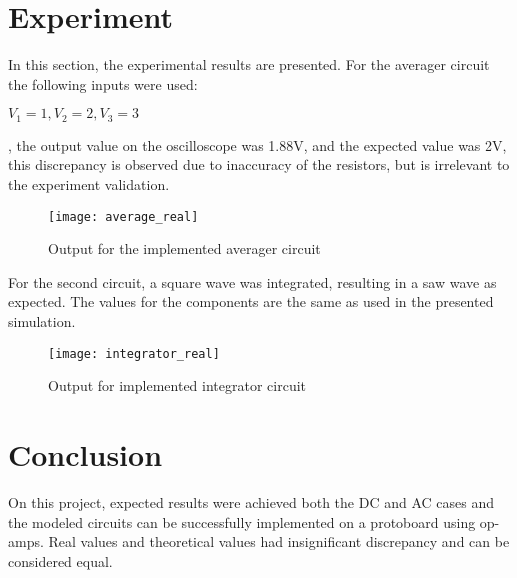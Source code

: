 \documentclass[journal]{IEEEtran}
\begin{document}
\section{Experiment}
    In this section, the experimental results are presented.
    For the averager circuit the following inputs were used: \centerline{$V_1 = 1, V_2 = 2, V_3 = 3$}, the output value on the oscilloscope was 1.88V, and the expected value was 2V, this discrepancy is observed due to inaccuracy of the resistors, but is irrelevant to  the experiment validation.
    \begin{figure}[H]
        \centering
        \texttt{[image: average\_real]}
        \caption{Output for the implemented averager circuit}
        \label{fig:average_real}
    \end{figure}
    For the second circuit, a square wave was integrated, resulting in a saw wave as expected. The values for the components are the same as used in the presented simulation.
    \begin{figure}[H]
        \centering
        \texttt{[image: integrator\_real]}
        \caption{Output for implemented integrator circuit}
        \label{fig:integrator_real}
    \end{figure}
    
\section{Conclusion}
    On this project, expected results were achieved both the DC and AC cases and the modeled circuits can be successfully implemented on a protoboard using op-amps. Real values and theoretical values had insignificant discrepancy and can be considered equal.




\end{document}
